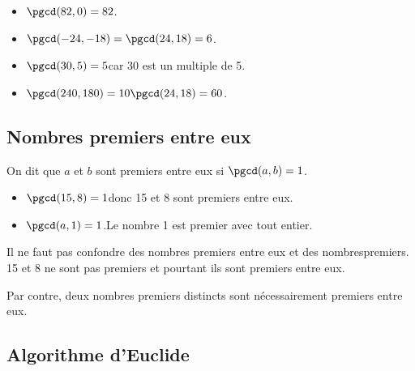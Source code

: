 \begin{exemples*1}
\begin{itemize}
\item $\pgcd(82,0)=82$.
\item $\pgcd(-24,-18)=\pgcd(24,18)=6$.
\item $\pgcd(30,5)=5$\enskip car 30 est un multiple de 5.
\item $\pgcd(240,180)=10\pgcd(24,18)=60$.
\end{itemize}

\vspace{-\baselineskip}
\end{exemples*1}

\subsection{Nombres premiers entre eux}
\begin{definition}
On dit que $a$ et $b$ sont premiers entre eux si $\pgcd(a,b)=1$.
\end{definition}\medskip

\begin{exemple*1}
\begin{itemize} 
\item $\pgcd(15,8)=1$\enskip donc 15 et 8 sont premiers entre eux.
\item $\pgcd(a,1)=1$.\enskip Le nombre 1 est premier avec tout entier.
\end{itemize}
\vspace{-\baselineskip}
\end{exemple*1}

\begin{attention}
  Il ne faut pas confondre des nombres premiers entre eux et des
  nombres\linebreak premiers. 15 et 8 ne sont pas premiers et pourtant ils sont
  premiers entre eux.

Par contre, deux nombres premiers distincts sont nécessairement premiers entre eux.
\end{attention}

\subsection{Algorithme d'Euclide}


